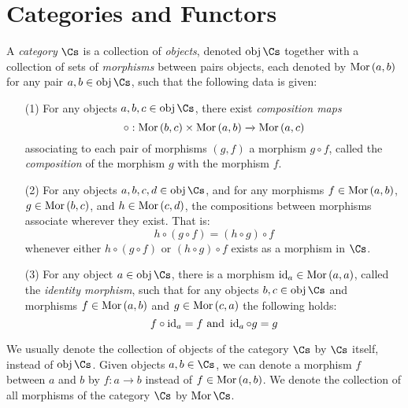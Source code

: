 \section{Categories and Functors}\label{section_1.1}

\begin{definition}
  A \textit{category} $\Cs$ is a collection of \textit{objects},
  denoted $\obj{\Cs}$ together with a collection of sets of
  \textit{morphisms} between pairs objects, each denoted by
  $\operatorname{Mor}{(a,b)}$ for any pair $a,b \in \obj{\Cs}$, such that the
  following data is given:
  \begin{enumerate}
    \item[(1)] For any objects $a,b,c \in \obj{\Cs}$, there exist
      \textit{composition maps}
      \begin{equation*}
        \circ:\operatorname{Mor}{(b,c)} \times \operatorname{Mor}{(a,b)} \xrightarrow{} \operatorname{Mor}{(a,c)}
      \end{equation*}
      associating to each pair of
      morphisms $(g,f)$ a morphism $g \circ f$, called the
      \textit{composition} of the morphism $g$ with the morphism $f$.

    \item[(2)] For any objects $a,b,c,d \in \obj{\Cs}$, and for any
      morphisms $f \in \operatorname{Mor}{(a,b)}$, $g \in \operatorname{Mor}{(b,c)}$, and $h \in
      \operatorname{Mor}{(c,d)}$, the compositions between morphisms associate
      wherever they exist. That is:
      \begin{equation*}
        h \circ (g \circ f)=(h \circ g) \circ f
      \end{equation*}
      whenever either $h \circ (g \circ f)$ or $(h \circ g) \circ f$
      exists as a morphism in $\Cs$.

    \item[(3)] For any object $a \in \obj{\Cs}$, there is a morphism
      $\operatorname{id}_a \in \operatorname{Mor}{(a,a)}$, called the \textit{identity morphism},
      such that for any objects $b,c \in \obj{\Cs}$ and morphisms $f
      \in \operatorname{Mor}{(a,b)}$ and $g \in \operatorname{Mor}{(c,a)}$ the following holds:
      \begin{equation*}
        f \circ \operatorname{id}_a=f \text{ and } \operatorname{id}_a \circ g=g
      \end{equation*}
  \end{enumerate}
  We usually denote the collection of objects of the category
  $\Cs$ by $\Cs$ itself, instead of $\obj{\Cs}$. Given objects
  $a,b \in \Cs$, we can denote a morphism $f$ between $a$ and $b$
  by $f:a \xrightarrow{} b$ instead of $f \in \operatorname{Mor}{(a,b)}$. We
  denote the collection of all morphisms of the category $\Cs$ by
  $\Mor{\Cs}$.
\end{definition}

